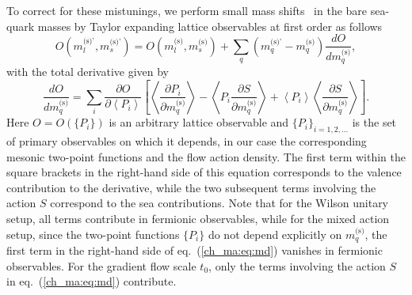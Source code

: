 To correct for these mistunings, we perform small mass shifts~\citep{Bruno:2016plf} in the bare sea-quark masses by Taylor expanding lattice observables at first order as follows
\begin{equation}
\label{ch_ma:eq:mass_shift}
{O}\left(m_l^{\textrm{(s)'}},m_s^{\textrm{(s)'}}\right)={O}\left(m_l^{\textrm{(s)}},m_s^{\textrm{(s)}}\right)+\sum_q\left(m_q^{\textrm{(s)'}}-m_q^{\textrm{(s)}}\right)\frac{d{O}}{dm_q^{\textrm{(s)}}},
\end{equation}
with the total derivative given by
\begin{equation}
\label{ch_ma:eq:md}
\frac{d{O}}{dm_q^{\textrm{(s)}}}=\sum_i\frac{\partial{O}}{\partial \left<P_i\right>}\left[\left<\frac{\partial P_i}{\partial m_q^{\textrm{(s)}}}\right>-\left<P_i\frac{\partial S}{\partial m_q^{\textrm{(s)}}}\right>+\left<P_i\right>\left<\frac{\partial S}{\partial m_q^{\textrm{(s)}}}\right>\right].
\end{equation}
Here $O=O\left(\{P_i\}\right)$ is an arbitrary lattice observable and $\{P_i\}_{i=1,2,...}$ is the set of primary observables on which it depends, in our case the corresponding mesonic two-point functions and the flow action density. The first term within the square brackets in the right-hand side of this equation corresponds to the valence contribution to the derivative, while the two subsequent terms involving the action $S$ correspond to the sea contributions. Note that for the Wilson unitary setup, all terms contribute in fermionic observables, while for the mixed action setup, since the two-point functions $\{P_i\}$ do not depend explicitly on $m_q^{\textrm{(s)}}$, the first term in the right-hand side of eq.~(\ref{ch_ma:eq:md}) vanishes in fermionic observables. For the gradient flow scale $t_0$, only the terms involving the action $S$ in eq.~(\ref{ch_ma:eq:md}) contribute.

